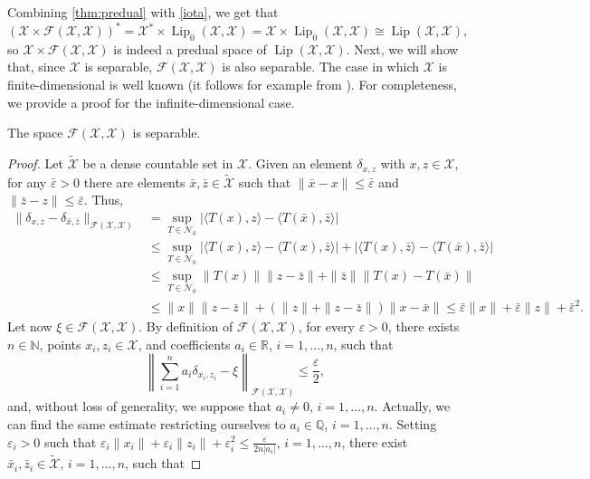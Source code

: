 \documentclass[onefignum,onetabnum]{siamonline250211}
\newcommand{\Lip}{\operatorname{Lip}}
\newcommand{\N}{\mathcal{N}}
\newcommand{\R}{\mathbb{R}}
\newcommand{\cX}{\mathcal{X}}
\begin{document}
Combining \cref{thm:predual} with \cref{iota}, we get that 
$$
\left(\cX\times\mathcal{F}(\cX, \cX)\right)^*=\cX^*\times\Lip_0(\cX, \cX)=\cX\times\Lip_0(\cX, \cX)\cong \Lip(\cX, \cX),
$$
so $\cX\times\mathcal{F}(\cX, \cX)$ is indeed a predual space of $\Lip(\cX, \cX)$.
Next, we will show that, since $\cX$ is separable, $\mathcal{F}(\cX, \cX)$ is also separable. The case in which $\cX$ is finite-dimensional is well known (it follows for example from \cite[Theorem 3.14]{Weaver}). For completeness, we provide a proof for the infinite-dimensional case.
\begin{theorem}
    \label{thm:separability}
    The space $\mathcal{F}(\cX, \cX)$ is separable.
\end{theorem}
\begin{proof}
Let $\widetilde{\cX}$ be a dense countable set in $\cX$. Given an element $\delta_{x,z}$ with $x,z \in\cX$, for any $\bar {\varepsilon} > 0$ there are elements $\bar{x}, \bar{z} \in \widetilde{\cX}$ such that $\|\bar x - x\|\leq \bar \varepsilon$ and $\|\bar z - z\| \leq \bar \varepsilon$. Thus,
\begin{equation*}
\begin{aligned}
    \|\delta_{x,z}-\delta_{\bar x,\bar z}\|_{\mathcal{F}(\cX,\cX)} & = \sup_{T \in \N_0} |\langle T(x), z \rangle - \langle T(\bar x), \bar z \rangle| \\ 
    &\leq \sup_{T\in \N_0} |\langle T(x), z \rangle - \langle T( x), \bar z \rangle| + |\langle T(x), \bar z \rangle - \langle T(\bar x), \bar z \rangle| \\
    & \leq \sup_{T\in \N_0}  \| T(x) \| \|z-\bar z\| + \|\bar z\| \|T(x) - T(\bar x)\| \\
    & \leq \|x\| \|z-\bar z\| + (\| z\| + \|z-\bar z\|) \| x- \bar x \| \leq \bar \varepsilon \|x\| + \bar \varepsilon \|z\| + \bar{\varepsilon}^2.
    \end{aligned}
\end{equation*}
Let now $\xi \in \mathcal{F}(\cX, \cX)$. By definition of $\mathcal{F}(\cX, \cX)$, for every $\varepsilon>0 $, there exists $n \in \mathbb{N}$, points $x_i,z_i\in\cX$, and coefficients $a_i\in \R$, $i=1,\dots,n$, such that
$$
\left\|\sum_{i=1}^n a_i\delta_{x_i,z_i}-\xi\right\|_{\mathcal{F}(\cX,\cX)} \leq \frac\varepsilon 2,
$$
and, without loss of generality, we suppose that $a_i\neq 0$, $i=1,\dots,n$. Actually, we can find the same estimate restricting ourselves to $a_i\in \mathbb{Q}$, $i=1,\dots,n$. Setting $\varepsilon_i > 0$ such that $\varepsilon_i \|x_i\| + \varepsilon_i \|z_i\| + \varepsilon_i^2 \leq \frac{\varepsilon}{2n |a_i|}$, $i=1,\dots, n$, there exist $\bar x_i, \bar z_i \in \widetilde{\cX}$, $i=1,\dots,n$, such that 

\end{proof}
\end{document}
